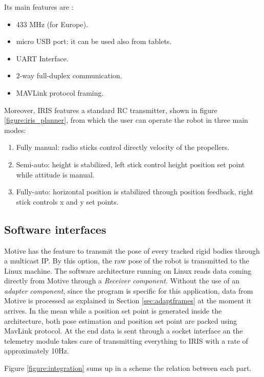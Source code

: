 \noindent
Its main features are \cite{3Dr}:

\begin{itemize}
\item 433 MHz (for Europe).
\item micro USB port: it can be used also from tablets.
\item UART Interface.
\item 2-way full-duplex communication.
\item MAVLink protocol framing.
\end{itemize}
Moreover, IRIS features a standard RC transmitter, shown in figure \ref{figure:iris_planner}, from which the user can operate the robot in three main modes:
\begin{enumerate}
\item Fully manual: radio sticks control directly velocity of the propellers.
\item Semi-auto: height is stabilized, left stick control height position set point while attitude is manual.
\item Fully-auto: horizontal position is stabilized through position feedback, right stick controls x and y set points.
\end{enumerate}

\subsection{Software interfaces}

Motive has the feature to transmit the pose of every tracked rigid bodies through a multicast IP. By this option, the raw pose of the robot is transmitted to the Linux machine. The software architecture running on Linux reads data coming directly from Motive through a \textit{Receiver component}. Without the use of an \textit{adapter component}, since the program is specific for this application, data from Motive is processed as explained in Section \ref{sec:adaptframes} at the moment it arrives. In the mean while a position set point is generated inside the architecture, both pose estimation and position set point are packed using MavLink protocol. At the end data is sent through a socket interface an the telemetry module takes care of transmitting everything to IRIS with a rate of approximately 10Hz.

Figure \ref{figure:integration} sums up in a scheme the relation between each part. 

